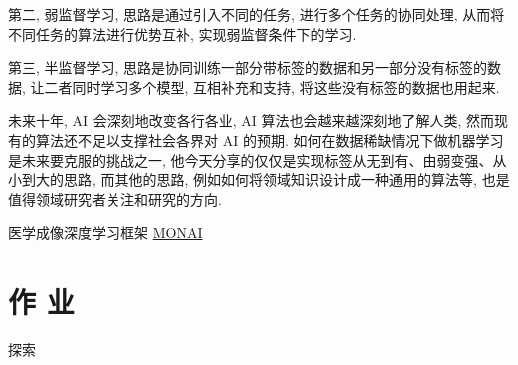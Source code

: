 第二, 弱监督学习, 思路是通过引入不同的任务, 进行多个任务的协同处理, 从而将不同任务的算法进行优势互补, 实现弱监督条件下的学习.

第三, 半监督学习, 思路是协同训练一部分带标签的数据和另一部分没有标签的数据, 让二者同时学习多个模型, 互相补充和支持, 将这些没有标签的数据也用起来.

未来十年, AI 会深刻地改变各行各业, AI 算法也会越来越深刻地了解人类, 然而现有的算法还不足以支撑社会各界对 AI 的预期. 如何在数据稀缺情况下做机器学习是未来要克服的挑战之一, 他今天分享的仅仅是实现标签从无到有、由弱变强、从小到大的思路, 而其他的思路, 例如如何将领域知识设计成一种通用的算法等, 也是值得领域研究者关注和研究的方向.

医学成像深度学习框架 \href{https://monai.io/}{MONAI} 
\section{作 业 }
\begin{custom}[explorecolor]{探索}

\end{custom}

\begin{think}

\end{think} 